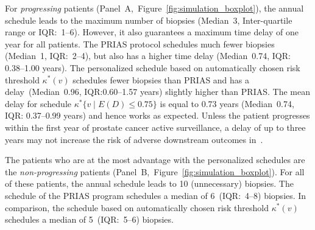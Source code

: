 For \textit{progressing} patients (Panel~A,~Figure~\ref{fig:simulation_boxplot}), the annual schedule leads to the maximum number of biopsies (Median~3, Inter-quartile range or IQR:~1--6). However, it also guarantees a maximum time delay of one year for all patients. The PRIAS protocol schedules much fewer biopsies (Median~1, IQR:~2--4), but also has a higher time delay (Median~0.74, IQR: 0.38--1.00 years). The personalized schedule based on automatically chosen risk threshold $\kappa^*(v)$ schedules fewer biopsies than PRIAS and has a delay~(Median~0.96, IQR:0.60--1.57 years) slightly higher than PRIAS. The mean delay for schedule $\kappa^*\{v \mid E(D)\leq 0.75\}$ is equal to 0.73 years (Median~0.74, IQR: 0.37--0.99 years) and hence works as expected. Unless the patient progresses within the first year of prostate cancer active surveillance, a delay of up to three years may not increase the risk of adverse downstream outcomes in~\citep{inoue2018comparative,carvalho}. 

The patients who are at the most advantage with the personalized schedules are the \textit{non-progressing} patients (Panel~B,~Figure~\ref{fig:simulation_boxplot}). For all of these patients, the annual schedule leads to 10 (unnecessary) biopsies. The schedule of the PRIAS program schedules a median of 6~(IQR:~4--8) biopsies. In comparison, the schedule based on automatically chosen risk threshold $\kappa^*(v)$ schedules a median of 5~(IQR:~5--6) biopsies.

